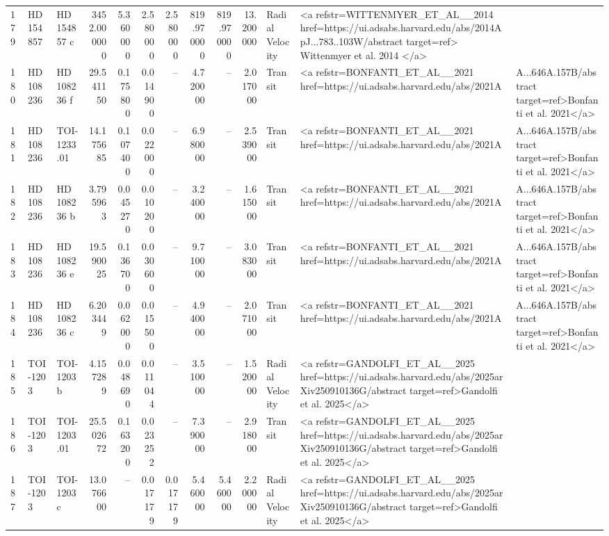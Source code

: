 \begin{tabular}{lllrrrrrrrll}
179 & HD 154857 & HD 154857 c & 3452.000000 & 5.360000 & 2.580000 & 2.580000 & 819.970000 & 819.970000 & 13.200000 & Radial Velocity & <a refstr=WITTENMYER_ET_AL__2014 href=https://ui.adsabs.harvard.edu/abs/2014ApJ...783..103W/abstract target=ref> Wittenmyer et al. 2014 </a> \\
180 & HD 108236 & HD 108236 f & 29.541150 & 0.175800 & 0.014900 & -- & 4.720000 & -- & 2.017000 & Transit & <a refstr=BONFANTI_ET_AL__2021 href=https://ui.adsabs.harvard.edu/abs/2021A&A...646A.157B/abstract target=ref>Bonfanti et al. 2021</a> \\
181 & HD 108236 & TOI-1233.01 & 14.175685 & 0.107400 & 0.022000 & -- & 6.980000 & -- & 2.539000 & Transit & <a refstr=BONFANTI_ET_AL__2021 href=https://ui.adsabs.harvard.edu/abs/2021A&A...646A.157B/abstract target=ref>Bonfanti et al. 2021</a> \\
182 & HD 108236 & HD 108236 b & 3.795963 & 0.045270 & 0.010200 & -- & 3.240000 & -- & 1.615000 & Transit & <a refstr=BONFANTI_ET_AL__2021 href=https://ui.adsabs.harvard.edu/abs/2021A&A...646A.157B/abstract target=ref>Bonfanti et al. 2021</a> \\
183 & HD 108236 & HD 108236 e & 19.590025 & 0.136700 & 0.030600 & -- & 9.710000 & -- & 3.083000 & Transit & <a refstr=BONFANTI_ET_AL__2021 href=https://ui.adsabs.harvard.edu/abs/2021A&A...646A.157B/abstract target=ref>Bonfanti et al. 2021</a> \\
184 & HD 108236 & HD 108236 c & 6.203449 & 0.062000 & 0.015500 & -- & 4.940000 & -- & 2.071000 & Transit & <a refstr=BONFANTI_ET_AL__2021 href=https://ui.adsabs.harvard.edu/abs/2021A&A...646A.157B/abstract target=ref>Bonfanti et al. 2021</a> \\
185 & TOI-1203 & TOI-1203 b & 4.157289 & 0.048690 & 0.011044 & -- & 3.510000 & -- & 1.520000 & Radial Velocity & <a refstr=GANDOLFI_ET_AL__2025 href=https://ui.adsabs.harvard.edu/abs/2025arXiv250910136G/abstract target=ref>Gandolfi et al. 2025</a> \\
186 & TOI-1203 & TOI-1203.01 & 25.502672 & 0.163200 & 0.023252 & -- & 7.390000 & -- & 2.918000 & Transit & <a refstr=GANDOLFI_ET_AL__2025 href=https://ui.adsabs.harvard.edu/abs/2025arXiv250910136G/abstract target=ref>Gandolfi et al. 2025</a> \\
187 & TOI-1203 & TOI-1203 c & 13.076600 & -- & 0.017179 & 0.017179 & 5.460000 & 5.460000 & 2.200000 & Radial Velocity & <a refstr=GANDOLFI_ET_AL__2025 href=https://ui.adsabs.harvard.edu/abs/2025arXiv250910136G/abstract target=ref>Gandolfi et al. 2025</a> \\

\end{tabular}
